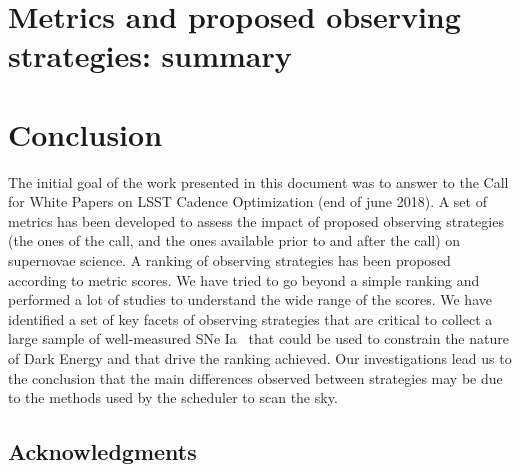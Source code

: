 \documentclass[\docopts]{\docclass}
\newcommand{\sne}{{SNe Ia }}
\begin{document}
\section{Metrics and proposed observing strategies: summary}
\label{sec:summary}



\section{Conclusion}
The initial goal of the work presented in this document was to answer to the Call for White Papers on LSST Cadence Optimization (end of june 2018). A set of metrics has been developed to assess the impact of proposed observing strategies (the ones of the call, and the ones available prior to and after the call) on supernovae science. A ranking of observing strategies has been proposed according to metric scores.
We have tried to go beyond a simple ranking and performed a lot of studies to understand the wide range of the scores. We have identified a set of key facets of observing strategies that are critical to collect a large sample of well-measured \sne~that could be used to constrain the nature of Dark Energy and that drive the ranking achieved. Our investigations lead us to the conclusion that the main differences observed between strategies may be due to the methods used by the scheduler to scan the sky.  


%





\subsection*{Acknowledgments}

\end{document}
